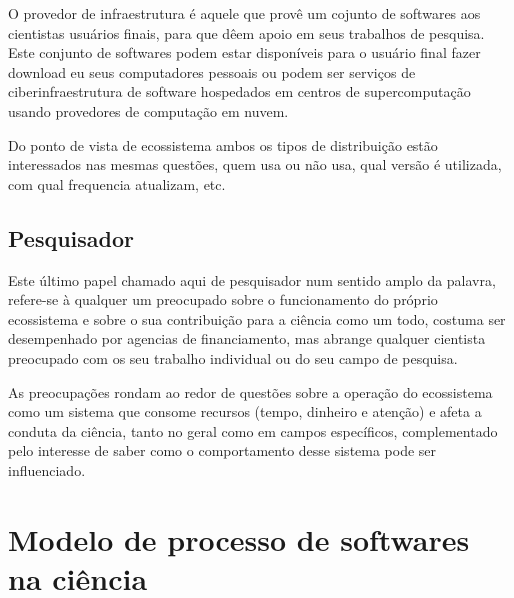 O provedor de infraestrutura é aquele que provê um cojunto de softwares aos
cientistas usuários finais, para que dêem apoio em seus trabalhos de pesquisa.
Este conjunto de softwares podem estar disponíveis para o usuário final fazer
download eu seus computadores pessoais ou podem ser serviços de
ciberinfraestrutura de software hospedados em centros de supercomputação
usando provedores de computação em nuvem.

Do ponto de vista de ecossistema ambos os tipos de distribuição estão
interessados nas mesmas questões, quem usa ou não usa, qual versão é utilizada,
com qual frequencia atualizam, etc.

\subsection{Pesquisador}

Este último papel chamado aqui de pesquisador num sentido amplo da palavra,
refere-se à qualquer um preocupado sobre o funcionamento do próprio ecossistema
e sobre o sua contribuição para a ciência como um todo, costuma ser
desempenhado por agencias de financiamento, mas abrange qualquer cientista
preocupado com os seu trabalho individual ou do seu campo de pesquisa.

As preocupações rondam ao redor de questões sobre a operação do ecossistema como
um sistema que consome recursos (tempo, dinheiro e atenção) e afeta a conduta da
ciência, tanto no geral como em campos específicos, complementado pelo interesse
de saber como o comportamento desse sistema pode ser influenciado.


\section{Modelo de processo de softwares na ciência}




